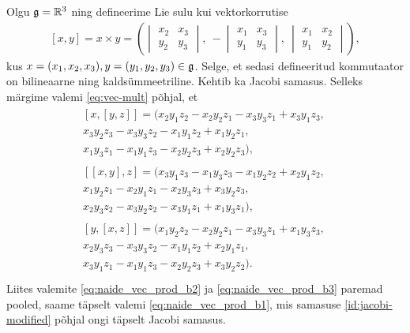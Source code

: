 \begin{naide}
    Olgu $\mathfrak{g} = \mathbb{R}^3$ ning defineerime Lie sulu kui vektorkorrutise
    \begin{align}\label{eq:vec-mult}
        [x, y] = x \times y = \left(
            \begin{vmatrix}
                x_2 & x_3 \\
                y_2 & y_3
            \end{vmatrix},\
            -\begin{vmatrix}
                x_1 & x_3 \\
                y_1 & y_3
            \end{vmatrix},\
            \begin{vmatrix}
                x_1 & x_2 \\
                y_1 & y_2
            \end{vmatrix}
        \right),
    \end{align}
    kus $x = (x_1, x_2, x_3), y = (y_1, y_2, y_3) \in \mathfrak{g}$. Selge, et sedasi
    defineeritud kommutaator on bilineaarne ning kaldsümmeetriline. Kehtib ka
    Jacobi samasus. Selleks märgime valemi \eqref{eq:vec-mult} põhjal, et
    \begin{align}
        \begin{split}
            [x, [y, z]] = (
                x_2 y_1 z_2 - x_2 y_2 z_1 - x_3 y_3 z_1 + x_3 y_1 z_3,\ \\
                x_3 y_2 z_3 - x_3 y_3 z_2 - x_1 y_1 z_2 + x_1 y_2 z_1,\ \\
                x_1 y_3 z_1 - x_1 y_1 z_3 - x_2 y_2 z_3 + x_2 y_2 z_3
            ),
        \end{split} \label{eq:naide_vec_prod_b1} \\
        \begin{split}
            [[x, y], z] = (
                x_3 y_1 z_3 - x_1 y_3 z_3 - x_1 y_2 z_2 + x_2 y_1 z_2,\ \\
                x_1 y_2 z_1 - x_2 y_1 z_1 - x_2 y_3 z_3 + x_3 y_2 z_3,\ \\
                x_2 y_3 z_2 - x_3 y_2 z_2 - x_3 y_1 z_1 + x_1 y_3 z_1
            ),
        \end{split} \label{eq:naide_vec_prod_b2} \\
        \begin{split}
            [y, [x, z]] = (
                x_1 y_2 z_2 - x_2 y_2 z_1 - x_3 y_3 z_1 + x_1 y_3 z_3,\ \\
                x_2 y_3 z_3 - x_3 y_3 z_2 - x_1 y_1 z_2 + x_2 y_1 z_1,\ \\
                x_3 y_1 z_1 - x_1 y_1 z_3 - x_2 y_2 z_3 + x_3 y_2 z_2
            ). \\
        \end{split} \label{eq:naide_vec_prod_b3}
    \end{align}
    Liites valemite \eqref{eq:naide_vec_prod_b2} ja \eqref{eq:naide_vec_prod_b3}
    paremad pooled, saame täpselt valemi \eqref{eq:naide_vec_prod_b1}, mis
    samasuse \eqref{id:jacobi-modified} põhjal ongi täpselt Jacobi samasus.
\end{naide}

